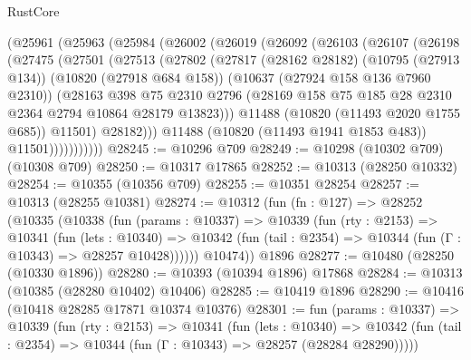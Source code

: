 \begin{lexlean}{RustCore}
\begin{coremodule}
        (@25961
          (@25963
            (@25984
              (@26002
                (@26019
                  (@26092
                    (@26103
                      (@26107
                        (@26198
                          (@27475
                            (@27501
                              (@27513
                                (@27802
                                  (@27817
                                    (@28162 @28182)
                                    (@10795 (@27913 @134))
                                    (@10820 (@27918 @684 @158))
                                    (@10637 (@27924 @158 @136 @7960 @2310))
                                    (@28163
                                      @398
                                      @75
                                      @2310
                                      @2796
                                      (@28169
                                        @158
                                        @75
                                        @185
                                        @28
                                        @2310
                                        @2364
                                        @2794
                                        @10864
                                        @28179
                                        @13823)))
                                  @11488
                                  (@10820 (@11493 @2020 @1755 @685))
                                  @11501)
                                @28182)))
                          @11488
                          (@10820 (@11493 @1941 @1853 @483))
                          @11501)))))))))))
@28245 := @10296 @709
@28249 := @10298 (@10302 @709) (@10308 @709)
@28250 := @10317 @17865
@28252 := @10313 (@28250 @10332)
@28254 := @10355 (@10356 @709)
@28255 := @10351 @28254
@28257 := @10313 (@28255 @10381)
@28274 := @10312
    (fun (fn : @127) =>
    @28252
      (@10335
        (@10338
          (fun (params : @10337) =>
          @10339
            (fun (rty : @2153) =>
            @10341
              (fun (lets : @10340) =>
              @10342 (fun (tail : @2354) => @10344 (fun (Γ : @10343) => @28257 @10428))))))
        @10474))
    @1896
@28277 := @10480 (@28250 (@10330 @1896))
@28280 := @10393 (@10394 @1896) @17868
@28284 := @10313 (@10385 (@28280 @10402) @10406)
@28285 := @10419 @1896
@28290 := @10416 (@10418 @28285 @17871 @10374 @10376)
@28301 := fun (params : @10337) =>
  @10339
    (fun (rty : @2153) =>
    @10341
      (fun (lets : @10340) =>
      @10342 (fun (tail : @2354) => @10344 (fun (Γ : @10343) => @28257 (@28284 @28290)))))

\end{coremodule}
\end{lexlean}
